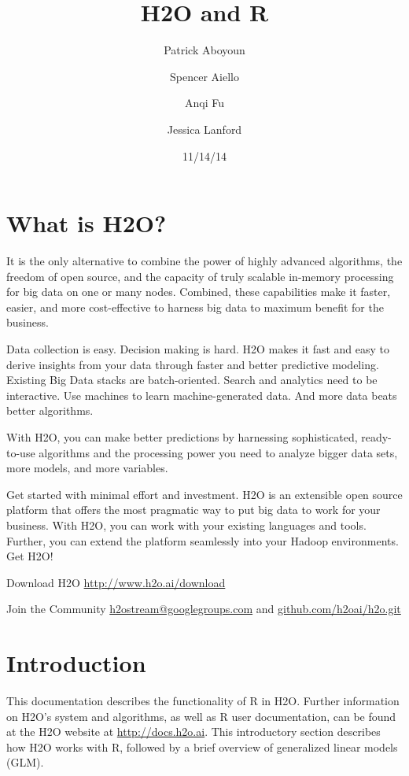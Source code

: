 \documentclass[11pt]{article}
\begin{document}
\title{H2O and R}
\author{Patrick Aboyoun}
\author{Spencer Aiello}
\author{Anqi Fu}
\author{Jessica Lanford}
\date{11/14/14}
\maketitle



\section{What is H2O?}

It is the only alternative to combine the power of highly advanced algorithms, the freedom of open source, and the capacity of truly scalable in-memory processing for big data on one or many nodes. Combined, these capabilities make it faster, easier, and more cost-effective to harness big data to maximum benefit for the business. 

Data collection is easy. Decision making is hard. H2O makes it fast and easy to derive insights from your data through faster and better predictive modeling. Existing Big Data stacks are batch-oriented. Search and analytics need to be interactive. Use machines to learn machine-generated data. And more data beats better algorithms. 

With H2O, you can make better predictions by harnessing sophisticated, ready-to-use algorithms and the processing power you need to analyze bigger data sets, more models, and more variables. 

Get started with minimal effort and investment. H2O is an extensible open source platform that offers the most pragmatic way to put big data to work for your business. With H2O, you can work with your existing languages and tools. Further, you can extend the platform seamlessly into your Hadoop environments. Get H2O!

Download H2O
\url{http://www.h2o.ai/download}

Join the Community
\url{h2ostream@googlegroups.com} and \url{github.com/h2oai/h2o.git}

\section{Introduction}

This documentation describes the functionality of R in H2O. Further information on H2O's system and algorithms, as well as R user documentation, can be found at the H2O website at \url{http://docs.h2o.ai}. This introductory section describes how H2O works with R, followed by a brief overview of generalized linear models (GLM). 
\end{document}
